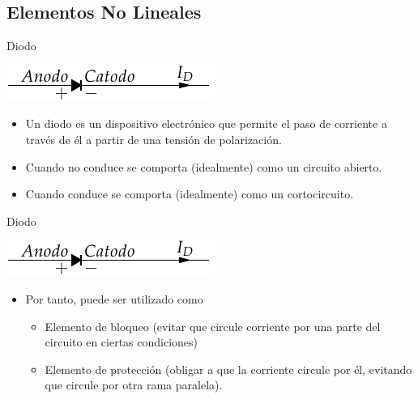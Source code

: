 \documentclass[xcolor={usenames,svgnames,dvipsnames}]{beamer}
\begin{document}
\subsection{Elementos No Lineales}
\label{sec:org4346416}

\begin{frame}[label={sec:org9db15fb}]{Diodo}
\begin{center}
\includegraphics[height=0.15\textheight]{../figs/Diodo.pdf}
\end{center}

\begin{itemize}
\item Un diodo es un dispositivo electrónico que permite el paso de
corriente a través de él a partir de una tensión de polarización.

\item Cuando \alert{no conduce} se comporta (idealmente) como un \alert{circuito abierto}.

\item Cuando \alert{conduce} se comporta (idealmente) como un \alert{cortocircuito}.
\end{itemize}
\end{frame}

\begin{frame}[label={sec:org1c86706}]{Diodo}
\begin{center}
\includegraphics[height=0.15\textheight]{../figs/Diodo.pdf}
\end{center}

\begin{itemize}
\item Por tanto, puede ser utilizado como

\begin{itemize}
\item \alert{Elemento de bloqueo} (evitar que circule corriente por una parte
del circuito en ciertas condiciones)

\item \alert{Elemento de protección} (obligar a que la corriente circule por
él, evitando que circule por otra rama paralela).
\end{itemize}
\end{itemize}
\end{frame}
\end{document}
